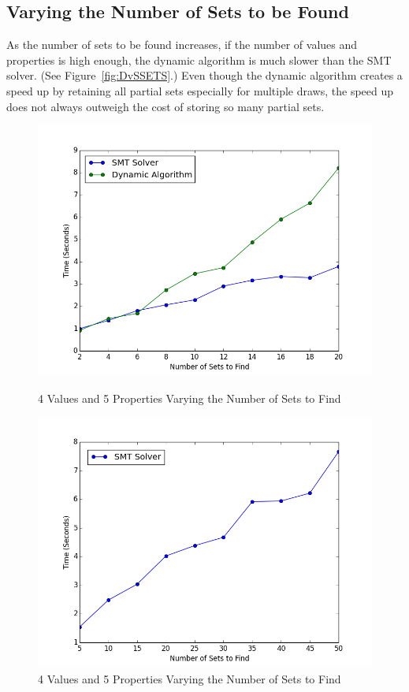 \documentclass[pageno]{jpaper}
\begin{document}
\subsection{Varying the Number of Sets to be Found}

As the number of sets to be found increases, if the number of values and properties is high enough, the dynamic algorithm is much slower than  the SMT solver. (See Figure~\ref{fig:DvSSETS}.) Even though the dynamic algorithm creates a speed up by retaining all partial sets especially for multiple draws, the speed up does not always outweigh the cost of storing so many partial sets.

\begin{figure}[htbb]
\begin{minipage}[b]{0.5\linewidth}
\centering
\includegraphics[width=.75\linewidth]{DvSSETS-v4p5n2468101214161820.png}
\caption{4 Values and 5 Properties Varying the Number of Sets to Find}
\label{fig:DvSSETS}
\end{minipage}
\hspace{0.5cm}
\begin{minipage}[b]{0.5\linewidth}
\centering
\includegraphics[width=.75\linewidth]{SMTOnlySETS-v4p5n5101520253035404550.png}
\caption{4 Values and 5 Properties Varying the Number of Sets to Find}
\label{fig:SMTSet}
\end{minipage}
\end{figure}
\end{document}
